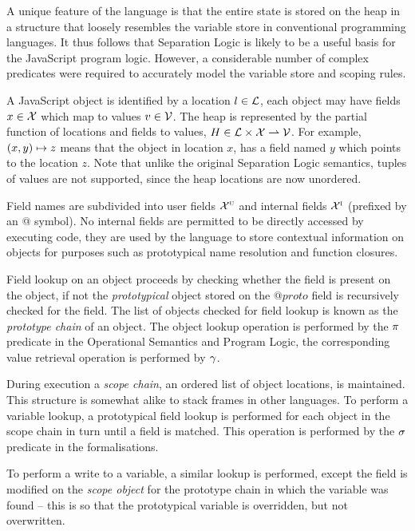 \documentclass[a4paper,notitlepage]{report}
\begin{document}
  A unique feature of the
  language is that the entire state is stored on the heap in a structure that
  loosely resembles the variable store in conventional programming languages. It
  thus follows that Separation Logic is likely to be a useful basis for the
  JavaScript program logic. However, a considerable number of complex predicates
  were required to accurately model the variable store and scoping rules.

  A JavaScript object is identified by a location $l \in \mathcal{L}$, each object may
  have fields $x \in \mathcal{X}$ which map to values $v \in \mathcal{V}$. The heap is
  represented by the partial function of locations and fields to
  values, $H \in \mathcal{L} \times \mathcal{X} \rightharpoonup \mathcal{V}$. For example, $(x, y)
  \mapsto z$ means that the object in location $x$, has a field named $y$
  which points to the location $z$. Note that unlike the original Separation
  Logic semantics, tuples of values are not supported, since the heap locations
  are now unordered.

  Field names are subdivided into user fields $\mathcal{X}^{\textsc{u}}$ and internal fields
  $\mathcal{X}^{\textsc{i}}$ (prefixed by an @ symbol). No internal fields are permitted to be
  directly accessed by executing code, they are used by the language to store
  contextual information on objects for purposes such as prototypical name
  resolution and function closures.

  Field lookup on an object proceeds by checking whether the field is present on
  the object, if not the \emph{prototypical} object stored on the $@proto$ field
  is recursively checked for the field. The list of
  objects checked for field lookup is known as the \emph{prototype chain}
  of an object. The object lookup operation is performed by the $\pi$
  predicate in the Operational Semantics and Program Logic, the corresponding
  value retrieval operation is performed by $\gamma$.

  During execution a \emph{scope chain}, an ordered list of object locations, is
  maintained. This structure is somewhat alike to stack frames in other languages.
  To perform a variable lookup, a prototypical field lookup is performed for
  each object in the scope chain in turn until a field is matched. This
  operation is performed by the $\sigma$ predicate in the formalisations.

  To perform a write to a variable, a similar lookup is performed, except the
  field is modified on the \emph{scope object} for the prototype chain in which the
  variable was found -- this is so that the prototypical variable is overridden,
  but not overwritten.
\end{document}
